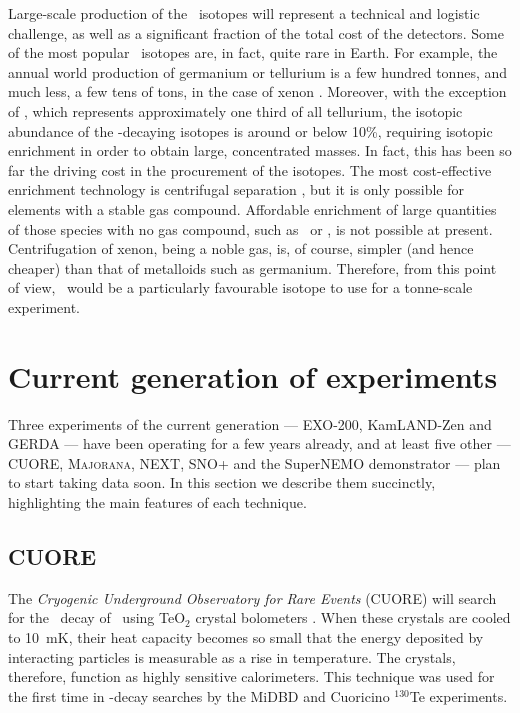 \documentclass{PoS}
\begin{document}
Large-scale production of the \bb\ isotopes will represent a technical and logistic challenge, as well as a significant fraction of the total cost of the detectors. Some of the most popular \bb\ isotopes are, in fact, quite rare in Earth. For example, the annual world production of germanium or tellurium is a few hundred tonnes, and much less, a few tens of tons, in the case of xenon \cite{Biller:2013wua}. Moreover, with the exception of \TE, which represents approximately one third of all tellurium, the isotopic abundance of the \bb-decaying isotopes is around or below 10\%, requiring isotopic enrichment in order to obtain large, concentrated masses. In fact, this has been so far the driving cost in the procurement of the isotopes. The most cost-effective enrichment technology is centrifugal separation \cite{ Giuliani:2012zu, Biller:2013wua, Tikhomirov:2000td}, but it is only possible for elements with a stable gas compound. Affordable enrichment of large quantities of those species with no gas compound, such as \CA\ or \ND, is not possible at present. Centrifugation of xenon, being a noble gas, is, of course, simpler (and hence cheaper) than that of metalloids such as germanium. Therefore, from this point of view, \XE\ would be a particularly favourable isotope to use for a tonne-scale experiment.


\section{Current generation of experiments} \label{sec:CurrentExperiments}
Three experiments of the current generation --- EXO-200, KamLAND-Zen and GERDA --- have been operating for a few years already, and at least five other --- CUORE, {\scshape Majorana}, NEXT, SNO+ and the SuperNEMO demonstrator --- plan to start taking data soon. In this section we describe them succinctly, highlighting the main features of each technique. 

\subsection{CUORE} \label{subsec:CUORE}
The \emph{Cryogenic Underground Observatory for Rare Events} (CUORE) will search for the \bbonu\ decay of \TE\ using TeO$_{2}$ crystal bolometers \cite{Artusa:2014lgv}. When these crystals are cooled to 10~mK, their heat capacity becomes so small that the energy deposited by interacting particles is measurable as a rise in temperature. The crystals, therefore, function as highly sensitive calorimeters. This technique was used for the first time in \bbonu-decay searches by the MiDBD \cite{Arnaboldi:2002te} and Cuoricino \cite{Andreotti:2010vj} $^{130}$Te experiments. 
\end{document}
